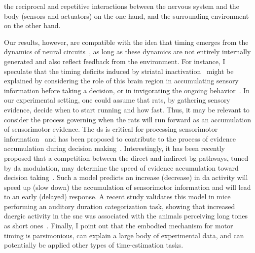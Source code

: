     the reciprocal and repetitive interactions between the nervous system and the body (sensors and actuators) on the one hand, and the surrounding environment on the other hand.
\par
Our results, however, are compatible with the idea that timing emerges from the dynamics of neural circuits~\cite{Paton2018NeuronRev}, as long as these dynamics are not entirely internally generated and also reflect feedback from the environment.
For instance, I speculate that the timing deficits induced by striatal inactivation~\cite{Rueda2015NN} might be explained by considering the role of this brain region in accumulating sensory information before taking a decision, or in invigorating the ongoing behavior~\cite[][more on the role of the striatum later on]{Yartsev2018eLife,Dunovan2016FrontNeurosci}.
In our experimental setting, one could assume that rats, by gathering sensory evidence, decide when to start running and how fast.
Thus, it may be relevant to consider the process governing when the rats will run forward as an accumulation of sensorimotor evidence.
The \gls{ds} is critical for processing sensorimotor information~\cite{Robbe2018} and has been proposed to contribute to the process of evidence accumulation during decision making~\cite{Yartsev2018eLife}.
Interestingly, it has been recently proposed that a competition between the direct and indirect \gls{bg} pathways, tuned by \gls{da} modulation, may determine the speed of evidence accumulation toward decision taking~\cite{Dunovan2016FrontNeurosci}.
Such a model predicts an increase (decrease) in \gls{da} activity will speed up (slow down) the accumulation of sensorimotor information and will lead to an early (delayed) response.
A recent study validates this model in mice performing an auditory duration categorization task, showing that increased \gls{da}ergic activity in the \gls{snc} was associated with the animals perceiving long tones as short ones~\cite{Paton2016Sci}.
Finally, I point out that the embodied mechanism for motor timing is parsimonious, can explain a large body of experimental data, and can potentially be applied other types of time-estimation tasks.